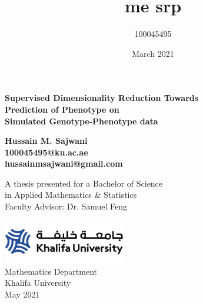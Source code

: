 \documentclass{article}
\title{me srp}
\author{100045495 }
\date{March 2021}
\begin{document}
\begin{titlepage}
    \begin{center}
        \vspace*{1cm}
 
        \textbf{Supervised Dimensionality Reduction Towards \\ 
        Prediction of Phenotype on \\
        Simulated Genotype-Phenotype data}
 
        \vspace{1.5cm}
 
        \textbf{
        Hussain M. Sajwani\\
        100045495@ku.ac.ae\\
        hussainmsajwani@gmail.com
        }
             
        A thesis presented for a Bachelor of Science \\ in Applied Mathematics \& Statistics \\
        Faculty Advisor: Dr. Samuel Feng
        
        \vspace{0.8cm}
        \includegraphics[width=0.4\textwidth]{university}\\
        Mathematics Department\\
        Khalifa University\\
        May 2021
             
    \end{center}
 \end{titlepage}
\newpage\tableofcontents
\newpage
\end{document}
